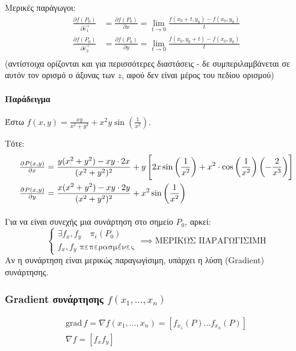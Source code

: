 \documentclass[11pt,a4paper,titlepage,draft]{article}
\begin{document}
Μερικές παράγωγοι:
\begin{align*}
\frac{\partial f(P_0)}{\partial \vec{e_1}} &= \frac{\partial f(P_0)}{\partial x} = \lim_{t\to0} \frac{f(x_0+t,y_0)-f(x_0,y_0)}{t} \\
\frac{\partial f(P_0)}{\partial \vec{e_2}} &= \frac{\partial f(P_0)}{\partial y} = \lim_{t\to0} \frac{f(x_0,y_0+t)-f(x_0,y_0)}{t} \\
\end{align*}
(αντίστοιχα ορίζονται και για περισσότερες διαστάσεις - δε συμπεριλαμβάνεται σε αυτόν τον ορισμό ο άξονας των \(z\), αφού δεν είναι μέρος του πεδίου ορισμού)

\paragraph{Παράδειγμα}
Έστω \(f(x,y)=\frac{xy}{x^2+y^2}+x^2y\sin\left(\frac{1}{x^2}\right)\).

Τότε:
\begin{align*}
\pd{P(x,y)}{x} &= \frac{y(x^2+y^2)-xy\cdot2x}{(x^2+y^2)^2}
+ y \left[
2x\sin\left(\frac{1}{x^2}\right)
+x^2 \cdot \cos\left( \frac{1}{x^2}\right)\left( -\frac{2}{x^3} \right)
\right] \\
\pd{P(x,y)}{y} &=\frac{x(x^2+y^2)-xy\cdot2y}{(x^2+y^2)^2}+x^2\sin \left( \frac{1}{x^2}\right)
\end{align*}

\paragraph{}
Για να είναι συνεχής μια συνάρτηση στο σημείο \(P_0\), αρκεί:
\[
\begin{cases}
\exists f_x, f_y\quad \pi_\epsilon (P_0) \\
f_x,f_y\text{ πεπερασμένες}
\end{cases}
\implies\text{ΜΕΡΙΚΩΣ ΠΑΡΑΓΩΓΙΣΙΜΗ}
\]
Αν η συνάρτηση είναι μερικώς παραγωγίσιμη, υπάρχει η λύση (\textlatin{Gradient}) συνάρτησης.

\subsubsection{\textlatin{Gradient} συνάρτησης \(f(x_1,\dots,x_n)\)}
\begin{gather*}
\mathrm{grad}\,f = \nabla f(x_1,\dots,x_n) =
\left[
f_{x_1}(P)\dots f_{x_n}(P)
\right] \\
\nabla f = \left[ f_x f_y \right]
\end{gather*}
\end{document}
